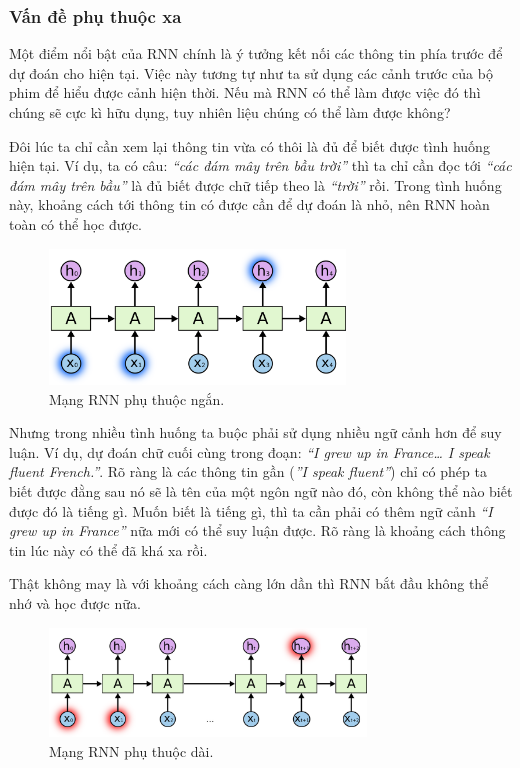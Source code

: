 \subsubsection{Vấn đề phụ thuộc xa}
Một điểm nổi bật của RNN chính là ý tưởng kết nối các thông tin phía trước để dự đoán cho hiện tại. Việc này tương tự như ta sử dụng các cảnh trước của bộ phim để hiểu được cảnh hiện thời. Nếu mà RNN có thể làm được việc đó thì chúng sẽ cực kì hữu dụng, tuy nhiên liệu chúng có thể làm được không?\par
Đôi lúc ta chỉ cần xem lại thông tin vừa có thôi là đủ để biết được tình huống hiện tại. Ví dụ, ta có câu: \textit{“các đám mây trên bầu trời”} thì ta chỉ cần đọc tới \textit{“các đám mây trên bầu”} là đủ biết được chữ tiếp theo là \textit{“trời”} rồi. Trong tình huống này, khoảng cách tới thông tin có được cần để dự đoán là nhỏ, nên RNN hoàn toàn có thể học được.\par
\begin{figure}[H]
    \centering
    \includegraphics[width=0.7\textwidth]{figures/RNN-shorttermdepdencies.png}
    \caption{Mạng RNN phụ thuộc ngắn.}
\end{figure}
Nhưng trong nhiều tình huống ta buộc phải sử dụng nhiều ngữ cảnh hơn để suy luận. Ví dụ, dự đoán chữ cuối cùng trong đoạn: \textit{“I grew up in France… I speak fluent French.”}. Rõ ràng là các thông tin gần (\textit{”I speak fluent”}) chỉ có phép ta biết được đằng sau nó sẽ là tên của một ngôn ngữ nào đó, còn không thể nào biết được đó là tiếng gì. Muốn biết là tiếng gì, thì ta cần phải có thêm ngữ cảnh \textit{“I grew up in France”} nữa mới có thể suy luận được. Rõ ràng là khoảng cách thông tin lúc này có thể đã khá xa rồi.\par
Thật không may là với khoảng cách càng lớn dần thì RNN bắt đầu không thể nhớ và học được nữa.
\begin{figure}[H]
    \centering
    \includegraphics[width=0.75\textwidth]{figures/RNN-longtermdependencies.png}
    \caption{Mạng RNN phụ thuộc dài.}
\end{figure}
